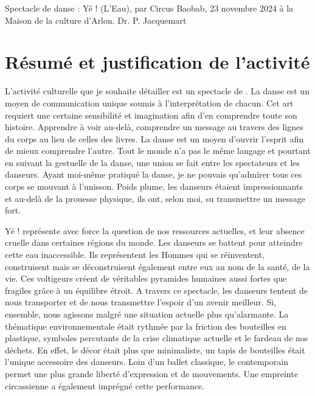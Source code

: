 Spectacle de danse : Yé ! (L’Eau), par Circus Baobab, 23 novembre 2024 à la Maison de la culture d’Arlon. 
Dr. P. Jacquemart

\section{Résumé et justification de l'activité}


L’activité culturelle que je souhaite détailler est un spectacle de  \parencite{circusbaobab_site}. La danse est un moyen de communication unique soumis à l’interprétation de chacun. Cet art requiert une certaine sensibilité et imagination afin d’en comprendre toute son histoire. Apprendre à voir au-delà, comprendre un message au travers des lignes du corps au lieu de celles des livres. La danse est un moyen d’ouvrir l’esprit afin de mieux comprendre l’autre. Tout le monde n’a pas le même langage et pourtant en suivant la gestuelle de la danse, une union se fait entre les spectateurs et les danseurs.  Ayant moi-même pratiqué la danse, je ne pouvais qu’admirer tous ces corps se mouvant à l'unisson. Poids plume, les danseurs étaient impressionnants et au-delà de la prouesse physique, ils ont, selon moi, su transmettre un message fort.
 
Yé ! représente avec force la question de nos ressources actuelles, et leur absence cruelle dans certaines régions du monde. Les danseurs se battent pour atteindre cette eau inaccessible. Ils représentent les Hommes qui se réinventent, construisent mais se déconstruisent également entre eux au nom de la santé, de la vie. Ces voltigeurs créent de véritables pyramides humaines aussi fortes que fragiles grâce à un équilibre étroit. A travers ce spectacle, les danseurs tentent de nous transporter et de nous transmettre l’espoir d’un avenir meilleur. Si, ensemble, nous agissons malgré une situation actuelle plus qu’alarmante. La thématique environnementale était rythmée par la friction des bouteilles en plastique, symboles percutants de la crise climatique actuelle et le fardeau de nos déchets. En effet, le décor était plus que minimaliste, un tapis de bouteilles était l’unique accessoire des danseurs. Loin d’un ballet classique, le contemporain permet une plus grande liberté d’expression et de mouvements. Une empreinte circassienne a également imprégné cette performance.
 

